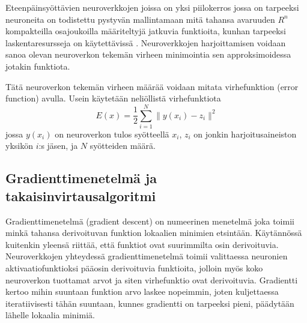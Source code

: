 \documentclass[finnish]{tktltiki2}
\theoremstyle{definition}
\theoremstyle{remark}
\begin{document}
    Eteenpäinsyöttävien neuroverkkojen joissa on yksi piilokerros jossa on tarpeeksi neuroneita on todistettu pystyvän mallintamaan mitä tahansa avaruuden $R^n$ kompakteilla osajoukoilla määriteltyjä jatkuvia funktioita, kunhan tarpeeksi laskentaresursseja on käytettävissä \cite{multilayer-feedforward-universal-approximators}. Neuroverkkojen harjoittamisen voidaan sanoa olevan neuroverkon tekemän virheen minimointia sen approksimoidessa jotakin funktiota.

  Tätä neuroverkon tekemän virheen määrää voidaan mitata virhefunktion (error function) avulla. Usein käytetään neliöllistä virhefunktiota
  \begin{equation}
    E(x) = \frac{1}{2} \sum_{i=1}^{N} \| y(x_i) - z_i \|^2
    \label{eq:error-function}
  \end{equation}
  jossa $y(x_i)$ on neuroverkon tulos syötteellä $x_i$, $z_i$ on jonkin harjoitusaineiston yksikön $i$:s jäsen, ja $N$ syötteiden määrä.




  \subsection{Gradienttimenetelmä ja takaisinvirtausalgoritmi}
  Gradienttimenetelmä (gradient descent) on numeerinen menetelmä joka toimii minkä tahansa derivoituvan funktion lokaalien minimien etsintään. Käytännössä kuitenkin yleensä riittää, että funktiot ovat suurimmilta osin derivoituvia. Neuroverkkojen yhteydessä gradienttimenetelmä toimii valittaessa neuronien aktivaatiofunktioksi pääosin derivoituvia funktioita, jolloin myös koko neuroverkon tuottamat arvot ja siten virhefunktio ovat derivoituvia. Gradientti kertoo mihin suuntaan funktion arvo laskee nopeimmin, joten kuljettaessa iteratiivisesti tähän suuntaan, kunnes gradientti on tarpeeksi pieni, päädytään lähelle lokaalia minimiä.
\end{document}
